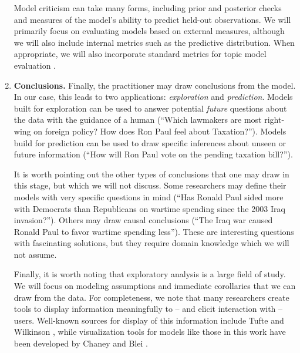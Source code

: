 \begin{enumerate}
    Model criticism can take many forms, including prior and posterior
    checks \cite{box:1980,gelman:1996} and measures of the model's
    ability to predict held-out observations. We will primarily focus
    on evaluating models based on external measures, although we will
    also include internal metrics such as the predictive
    distribution. When appropriate, we will also incorporate standard
    metrics for topic model evaluation \cite{wallach:2009}.
  
  \item \textbf{Conclusions.} Finally, the practitioner may draw
    conclusions from the model.  In our case, this leads to two
    applications: \emph{exploration} and \emph{prediction}.  Models
    built for exploration can be used to answer potential \emph{future}
    questions about the data with the guidance of a human (``Which
    lawmakers are most right-wing on foreign policy?  How does Ron
    Paul feel about Taxation?'').  Models
    build for prediction can be used to draw specific inferences about
    unseen or future information (``How will Ron Paul vote on the
    pending taxation bill?'').

    It is worth pointing out the other types of conclusions that one
    may draw in this stage, but which we will not discuss. Some
    researchers may define their models with very specific questions
    in mind (``Has Ronald Paul sided more with Democrats than
    Republicans on wartime spending since the 2003 Iraq invasion?'').
    Others may draw causal conclusions (``The Iraq war caused Ronald
    Paul to favor wartime spending less''). These are interesting
    questions with fascinating solutions, but they require domain
    knowledge which we will not assume.

    Finally, it is worth noting that exploratory analysis is a large
    field of study.  We will focus on modeling assumptions and
    immediate corollaries that we can draw from the data.  For
    completeness, we note that many researchers create tools to
    display information meaningfully to -- and elicit interaction with
    -- users.  Well-known sources for display of this information
    include Tufte \cite{tufte:2001} and Wilkinson
    \cite{wilkinson:2005}, while visualization tools for models like
    those in this work have been developed by Chaney and Blei
    \cite{chaney:2012}.

\end{enumerate}

